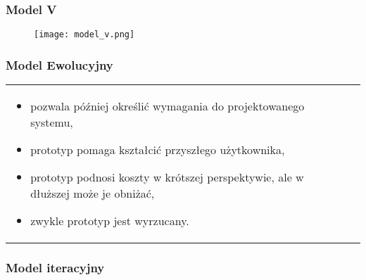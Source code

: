 \documentclass[a4paper]{article}
\begin{document}
    \subsubsection{Model V}
    \begin{figure}[H]
        \texttt{[image: model\_v.png]}
    \end{figure}

    \subsubsection{Model Ewolucyjny}
    \begin{table}[H]
        \begin{center}
            \begin{tabular}{ p{8cm} c }
                \begin{itemize}
                    \item pozwala później określić wymagania do projektowanego systemu,
                    \item prototyp pomaga kształcić przyszłego użytkownika,
                    \item prototyp podnosi koszty w krótszej perspektywie, ale w
                    dłuższej może je obniżać,
                    \item zwykle prototyp jest wyrzucany.
                \end{itemize}
                &
                \raisebox{-\totalheight}{\texttt{[image: model\_ewolucyjny.png]}}
                \\
            \end{tabular}
        \end{center}
    \end{table}


    \subsubsection{Model iteracyjny}
\end{document}
